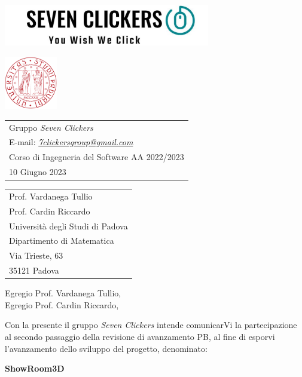 \documentclass[10pt]{article}
\begin{document}
\noindent\begin{minipage}{0.5\textwidth}%
\includegraphics[width=9cm]{images/logo.jpeg}
\end{minipage}%
\hfill%
\begin{minipage}{4cm}
\includegraphics[width=2.3cm]{images/uni.png}
\end{minipage}

\bigskip\bigskip

\begin{tabular}{ @{} l  }
  Gruppo \textit{Seven Clickers} \\ 
  E-mail: \textit{\href{mailto:7clickersgroup@gmail.com}{7clickersgroup@gmail.com} }\\ 
  Corso di Ingegneria del Software AA 2022/2023 \\
  10 Giugno 2023
\end{tabular}

\bigskip
\hfill
\begin{tabular}{ l @{} }
Prof. Vardanega Tullio\\
Prof. Cardin Riccardo\\
Università degli Studi di Padova\\
Dipartimento di Matematica\\
Via Trieste, 63\\
35121 Padova
\end{tabular}

\bigskip

Egregio Prof. Vardanega Tullio,\\
Egregio Prof. Cardin Riccardo,\\

\bigskip

Con la presente il gruppo \textit{Seven Clickers} intende comunicarVi la partecipazione al secondo passaggio della revisione di avanzamento PB,
al fine di esporvi l’avanzamento dello sviluppo del progetto, denominato:

\begin{center}
  \textbf{ShowRoom3D}
\end{center}
\end{document}
